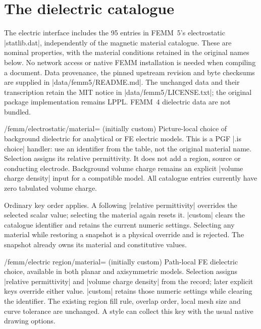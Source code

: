 \section{The dielectric catalogue}
\label{sec:dielectrics}

The electric interface includes the 95 entries in FEMM~5's electrostatic
|statlib.dat|, independently of the magnetic material catalogue. These are
nominal properties, with the material conditions retained in the original
names below. No network access or native FEMM installation is needed when
compiling a document. Data provenance, the pinned upstream revision and byte
checksums are supplied in |data/femm5/README.md|. The unchanged data and their
transcription retain the MIT notice in |data/femm5/LICENSE.txt|; the original
package implementation remains LPPL. FEMM~4 dielectric data are not bundled.

\begin{key}{/femm/electrostatic/material= (initially custom)}
Picture-local choice of background dielectric for analytical or FE electric
models. This is a PGF |.is choice| handler: use an identifier from the table,
not the original material name. Selection assigns its relative permittivity.
It does not add a region, source or conducting electrode. Background volume
charge remains an explicit |volume charge density| input for a compatible
model. All catalogue entries currently have zero tabulated volume charge.

Ordinary key order applies. A following |relative permittivity| overrides
the selected scalar value; selecting the material again resets it. |custom|
clears the catalogue identifier and retains the current numeric settings.
Selecting any material while restoring a snapshot is a physical override and
is rejected. The snapshot already owns its material and constitutive values.
\end{key}
\begin{key}{/femm/electric region/material= (initially custom)}
Path-local FE dielectric choice, available in both planar and axisymmetric
models. Selection assigns |relative permittivity| and |volume charge density|
from the record; later explicit keys override either value. |custom| retains
those numeric settings while clearing the identifier. The existing region
fill rule, overlap order, local mesh size and curve tolerance are unchanged.
A style can collect this key with the usual native drawing options.
\end{key}

